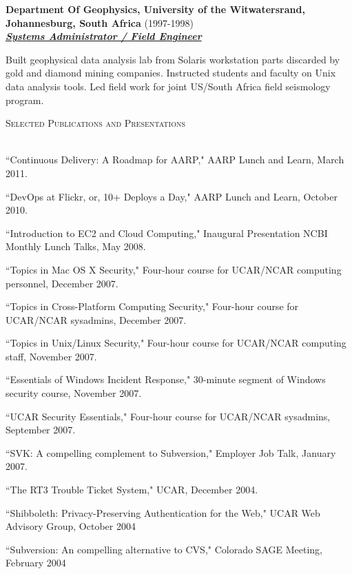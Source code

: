 \documentclass{article}
\newcommand{\lineunder}{\vspace*{-8pt} \\ \hspace*{-18pt} \hrulefill \\}
\newcommand{\header}[1]{{\hspace*{-15pt}\vspace*{6pt} \textsc{#1}} \vspace*{-6pt} \lineunder}
\newcommand{\employer}[3]{{ \textbf{#1} (#2)\\ \underline{\textbf{\emph{#3}}}\\ \nopagebreak }}
\newenvironment{achievements}{\begin{list}{\topsep 0pt \itemsep -2pt}} {\vspace*{4pt}\end{list}}
\begin{document}
\employer{Department Of Geophysics, University of the Witwatersrand,
Johannesburg, South Africa}{1997-1998}{Systems Administrator / Field Engineer}
\begin{achievements}
    \item Built geophysical data analysis lab from Solaris workstation parts discarded by gold and diamond mining companies.  Instructed students and faculty on Unix data analysis tools.  Led field work for joint US/South Africa field seismology program.
\end{achievements}


\header{Selected Publications and Presentations}
\begin{achievements}
\item ``Continuous Delivery: A Roadmap for AARP," AARP Lunch and Learn, March 2011.
\item ``DevOps at Flickr, or, 10+ Deploys a Day," AARP Lunch and Learn, October 2010.
\item ``Introduction to EC2 and Cloud Computing," Inaugural Presentation NCBI Monthly Lunch Talks, May 2008.
\item ``Topics in Mac OS X Security," Four-hour course for UCAR/NCAR computing personnel, December 2007.
\item ``Topics in Cross-Platform Computing Security," Four-hour course for UCAR/NCAR sysadmins, December 2007.  
\item ``Topics in Unix/Linux Security," Four-hour course for UCAR/NCAR computing staff, November 2007.
\item ``Essentials of Windows Incident Response," 30-minute segment of Windows security course, November 2007.
\item ``UCAR Security Essentials,"  Four-hour course for UCAR/NCAR sysadmins, September 2007.
\item ``SVK: A compelling complement to Subversion," Employer Job Talk, January 2007.
\item ``The RT3 Trouble Ticket System," UCAR, December 2004.  
\item ``Shibboleth: Privacy-Preserving Authentication for the Web," UCAR Web Advisory Group, October 2004
\item ``Subversion: An compelling alternative to CVS," Colorado SAGE Meeting, February 2004

\end{achievements}
\end{document}
